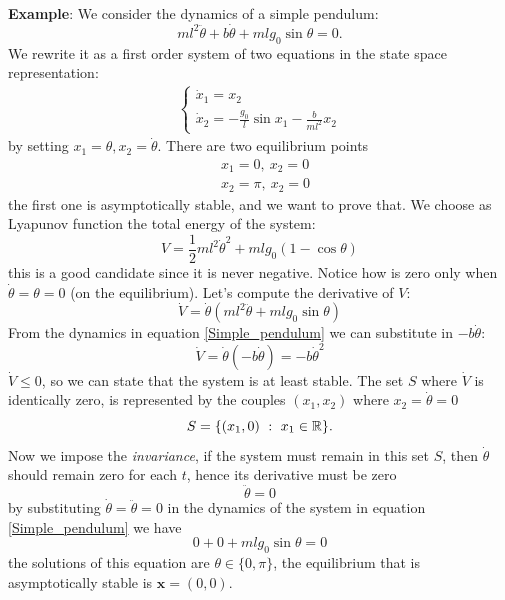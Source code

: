 \documentclass[10pt, a4paper]{report}
\begin{document}
\noindent\textbf{Example}: We consider the dynamics of a simple pendulum:\begin{equation}\label{Simple_pendulum}
    ml^2\ddot \theta+b\dot\theta+mlg_0\sin\theta=0.
\end{equation}
We rewrite it as a first order system of two equations in the state space representation:\begin{align}\begin{cases}
    \dot x_1=x_2\\ 
    \dot x_2=-\frac{g_0}{l}\sin x_1-\frac{b}{ml^2}x_2
    \end{cases}
\end{align}
by setting $x_1=\theta, x_2=\dot \theta$.
There are two equilibrium points
\begin{align}
    &x_1=0, \ x_2=0\\ 
    &x_2=\pi, \ x_2=0
\end{align}
the first one is asymptotically stable, and we want to prove that. We choose as Lyapunov function the total energy of the system:\begin{equation}
    V=\frac{1}{2}ml^2\dot \theta^2+mlg_0(1-\cos\theta)
\end{equation}
this is a good candidate since it is never negative. Notice how is zero only when $\dot\theta=\theta=0$ (on the equilibrium). Let's compute the derivative of $V$:\begin{equation}
    \dot V =\dot\theta(ml^2\ddot\theta+mlg_0\sin\theta)
\end{equation}
From the dynamics in equation \eqref{Simple_pendulum} we can substitute in $-b\dot\theta$:
\begin{equation}
    \dot V =\dot\theta(-b\dot \theta)=-b\dot\theta^2
\end{equation}
$\dot V\le 0$, so we can state that the system is at least stable. The set $S$ where $\dot V$ is identically zero, is represented by the couples $(x_1,x_2)$ where $x_2=\dot\theta=0$\begin{equation}
    S=\{(x_1,0) \ : \ x_1\in {\mathbb R}\}.
\end{equation}
Now we impose the \textit{invariance}, if the system must remain in this set $S$, then $\dot\theta$ should remain zero for each $t$, hence its derivative must be zero\begin{equation}
    \ddot\theta=0
\end{equation}
by substituting $\dot\theta=\ddot\theta=0$ in the dynamics of the system in equation \eqref{Simple_pendulum} we have\begin{equation}
    0+0+mlg_0\sin\theta=0
\end{equation}
the solutions of this equation are $\theta\in\{0,\pi\}$, the equilibrium that is asymptotically stable is $\mathbf x=(0,0)$.\bigskip 
\end{document}
